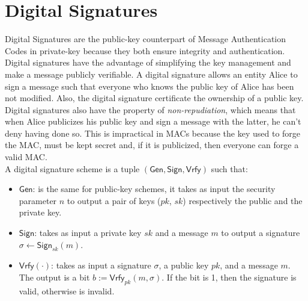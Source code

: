 \section{Digital Signatures}
Digital Signatures are the public-key counterpart of Message Authentication Codes in private-key because they both ensure integrity and authentication. Digital signatures have the advantage of simplifying the key management and make a message publicly verifiable.
A digital signature allows an entity Alice to sign a message such that everyone who knows the public key of Alice has been not modified. Also, the digital signature certificate the ownership of a public key.\\
Digital signatures also have the property of \emph{non-repudiation}, which means that when Alice publicizes his public key and sign a message with the latter, he can't deny having done so. This is impractical in MACs because the key used to forge the MAC, must be kept secret and, if it is publicized, then everyone can forge a valid MAC.\\
A digital signature scheme is a tuple $(\mathsf{Gen}, \mathsf{Sign}, \mathsf{Vrfy})$ such that:
\begin{itemize}
    \item{$\mathsf{Gen}$}: is the same for public-key schemes, it takes as input the security parameter $n$ to output a pair of keys ($pk$, $sk$) respectively the public and the private key.
    \item{$\mathsf{Sign}$}: takes as input a private key $sk$ and a message $m$ to output a signature $\sigma \leftarrow \mathsf{Sign}_{sk}(m)$.
    \item{$\mathsf{Vrfy}(\cdot)$}: takes as input a signature $\sigma$, a public key $pk$, and a message $m$. The output is a bit $b := \mathsf{Vrfy}_{pk}(m, \sigma)$. If the bit is 1, then the signature is valid, otherwise is invalid.
\end{itemize}

